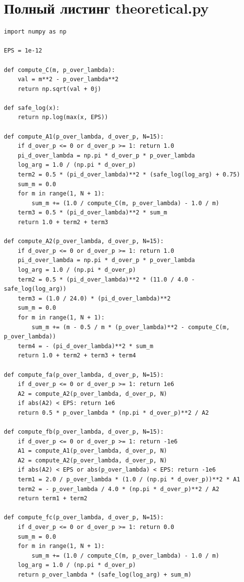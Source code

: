 \section{Полный листинг theoretical.py} \label{app:theoretical}
\begin{verbatim}
import numpy as np

EPS = 1e-12

def compute_C(m, p_over_lambda):
    val = m**2 - p_over_lambda**2
    return np.sqrt(val + 0j)

def safe_log(x):
    return np.log(max(x, EPS))

def compute_A1(p_over_lambda, d_over_p, N=15):
    if d_over_p <= 0 or d_over_p >= 1: return 1.0
    pi_d_over_lambda = np.pi * d_over_p * p_over_lambda
    log_arg = 1.0 / (np.pi * d_over_p)
    term2 = 0.5 * (pi_d_over_lambda)**2 * (safe_log(log_arg) + 0.75)
    sum_m = 0.0
    for m in range(1, N + 1):
        sum_m += (1.0 / compute_C(m, p_over_lambda) - 1.0 / m)
    term3 = 0.5 * (pi_d_over_lambda)**2 * sum_m
    return 1.0 + term2 + term3

def compute_A2(p_over_lambda, d_over_p, N=15):
    if d_over_p <= 0 or d_over_p >= 1: return 1.0
    pi_d_over_lambda = np.pi * d_over_p * p_over_lambda
    log_arg = 1.0 / (np.pi * d_over_p)
    term2 = 0.5 * (pi_d_over_lambda)**2 * (11.0 / 4.0 - safe_log(log_arg))
    term3 = (1.0 / 24.0) * (pi_d_over_lambda)**2
    sum_m = 0.0
    for m in range(1, N + 1):
        sum_m += (m - 0.5 / m * (p_over_lambda)**2 - compute_C(m, p_over_lambda))
    term4 = - (pi_d_over_lambda)**2 * sum_m
    return 1.0 + term2 + term3 + term4

def compute_fa(p_over_lambda, d_over_p, N=15):
    if d_over_p <= 0 or d_over_p >= 1: return 1e6
    A2 = compute_A2(p_over_lambda, d_over_p, N)
    if abs(A2) < EPS: return 1e6
    return 0.5 * p_over_lambda * (np.pi * d_over_p)**2 / A2

def compute_fb(p_over_lambda, d_over_p, N=15):
    if d_over_p <= 0 or d_over_p >= 1: return -1e6
    A1 = compute_A1(p_over_lambda, d_over_p, N)
    A2 = compute_A2(p_over_lambda, d_over_p, N)
    if abs(A2) < EPS or abs(p_over_lambda) < EPS: return -1e6
    term1 = 2.0 / p_over_lambda * (1.0 / (np.pi * d_over_p))**2 * A1
    term2 = - p_over_lambda / 4.0 * (np.pi * d_over_p)**2 / A2
    return term1 + term2

def compute_fc(p_over_lambda, d_over_p, N=15):
    if d_over_p <= 0 or d_over_p >= 1: return 0.0
    sum_m = 0.0
    for m in range(1, N + 1):
        sum_m += (1.0 / compute_C(m, p_over_lambda) - 1.0 / m)
    log_arg = 1.0 / (np.pi * d_over_p)
    return p_over_lambda * (safe_log(log_arg) + sum_m)


\end{verbatim}
